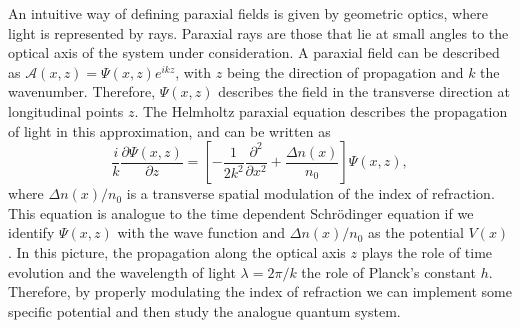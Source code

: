 \documentclass[a0,portrait]{a0poster}
\begin{document}
\begin{multicols}{2}
An intuitive way of defining paraxial fields is given by geometric optics, where light is represented by rays. Paraxial rays are those that lie at small angles to the optical axis of the system under consideration. A paraxial field can be described as $\mathcal{A}\left(x,z\right) = \Psi\left(x,z\right)e^{ikz}$, with $z$ being the direction of propagation and $k$ the wavenumber. Therefore, $\Psi\left(x,z\right)$ describes the field in the transverse direction at longitudinal points $z$. The Helmholtz paraxial equation describes the propagation of light in this approximation, and can be written as \cite{Marcuse} 
\begin{equation}
\frac{i}{k}\frac{\partial \Psi\left(x,z\right)}{\partial z} = \left[-\frac{1}{2k^{2}}\frac{\partial^{2}}{\partial x^{2}} + \frac{\Delta n(x)}{n_{0}}\right]\Psi\left(x,z\right),
\label{eq:helmholtz}
\end{equation}
where $\Delta n(x)/n_{0}$ is a transverse spatial modulation of the index of refraction. This equation is analogue to the time dependent Schr\"{o}dinger equation if we identify $\Psi\left(x,z\right)$ with the wave function and $\Delta n(x)/n_{0}$ as the potential $V(x)$. In this picture, the propagation along the optical axis $z$ plays the role of time evolution and the wavelength of light $\lambda = 2\pi/k$ the role of Planck's constant $h$. Therefore, by properly modulating the index of refraction we can implement some specific potential and then study the analogue quantum system.


\end{multicols}
\end{document}
